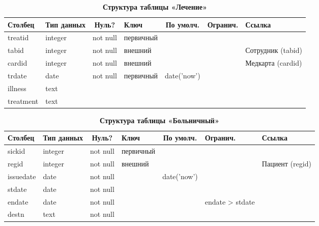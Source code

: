 \documentclass[14pt,a4paper,russian]{extreport}
\begin{document}
\begin{table}[h!]
    \caption{ } 
    \begin{subtable}[t]{\textwidth}
        \caption{\textbf{Структура таблицы «Лечение»}}
    \begin{tabularx}{\textwidth}{| X | X | c | X | c | c | X |}
        \hline
        \textbf{Столбец} & \textbf{Тип данных} & \textbf{Нуль?} & \textbf{Ключ} & \textbf{По
        умолч.} & \textbf{Огранич.} & \textbf{Ссылка} \\ \hline
        treatid & integer & not null & первичный & & & \\ \hline
        tabid & integer & not null &  внешний & & & Сотрудник (tabid) \\ \hline
        cardid & integer & not null &  внешний & & & Медкарта (cardid) \\ \hline
        trdate & date & not null & первичный & date('now') & & \\ \hline 
        illness & text & & & & & \\ \hline
        treatment & text & & & & & \\ \hline
    \end{tabularx}
    \end{subtable}
    \label{table:treat}
\end{table}


\begin{table}[h!]
    \caption{ } 
    \begin{subtable}[t]{\textwidth}
        \caption{\textbf{Структура таблицы «Больничный»}}
    \begin{tabularx}{\textwidth}{| X | X | c | X | c | X | X |}
        \hline
        \textbf{Столбец} & \textbf{Тип данных} & \textbf{Нуль?} & \textbf{Ключ} & \textbf{По
        умолч.} & \textbf{Огранич.} & \textbf{Ссылка} \\ \hline
            sickid & integer & not null & первичный & & & \\ \hline
            regid & integer & not null & внешний & & & Пациент (regid)\\ \hline
            issuedate & date & not null & & date('now') & & \\ \hline
        stdate & date & not null & & & & \\ \hline
        endate & date & not null & & & endate > stdate & \\ \hline
        destn & text & not null & & & & \\ \hline
    \end{tabularx}
    \end{subtable}
    \label{table:sickleave}
\end{table}
\end{document}
